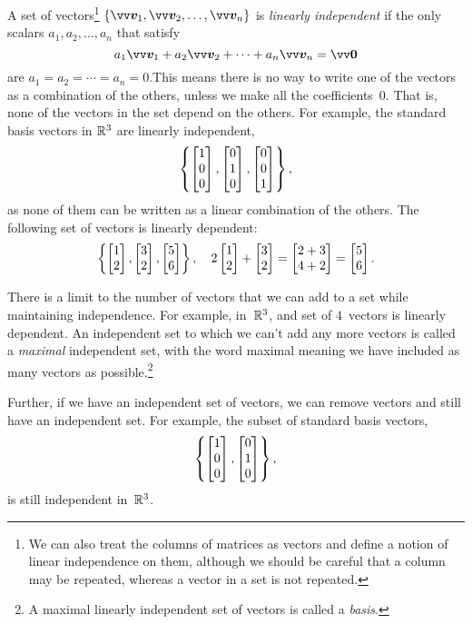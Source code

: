 \documentclass[twoside]{article}
\begin{document}
A set of vectors\footnote{
  We can also treat the columns of matrices as vectors and define a notion of linear independence on them, although we should be careful that a column may be repeated, whereas a vector in a set is not repeated.
}
$\{\bv{v}_1, \bv{v}_2, \ldots, \bv{v}_n\}$ is \emph{linearly independent} if the only scalars ${a_1, a_2, \ldots, a_n}$ that satisfy
\begin{equation*}
  a_1\bv{v}_1 + a_2\bv{v}_2 + \cdots + a_n\bv{v}_n = \bv{0}
\end{equation*}
are ${a_1 = a_2 = \cdots = a_n = 0}$.This means there is no way to write one of the vectors as a combination of the others, unless we make all the coefficients~$0$.
That is, none of the vectors in the set depend on the others.
For example, the standard basis vectors in $\mathbb{R}^3$ are linearly independent,
\begin{equation*}
  \left\{\begin{bmatrix}1\\0\\0\end{bmatrix}, \begin{bmatrix}0\\1\\0\end{bmatrix}, \begin{bmatrix}0\\0\\1\end{bmatrix}\right\},
\end{equation*}
as none of them can be written as a linear combination of the others.
The following set of vectors is linearly dependent:
\begin{equation*}
  \left\{\begin{bmatrix}1\\2\end{bmatrix}, \begin{bmatrix}3\\2\end{bmatrix}, \begin{bmatrix}5\\6\end{bmatrix}\right\}, \quad 2\begin{bmatrix}1\\2\end{bmatrix} + \begin{bmatrix}3\\2\end{bmatrix} = \begin{bmatrix}2 + 3\\4 + 2\end{bmatrix} = \begin{bmatrix}5\\6\end{bmatrix}.
\end{equation*}

There is a limit to the number of vectors that we can add to a set while maintaining independence.
For example, in~$\mathbb{R}^3$, and set of $4$~vectors is linearly dependent.
An independent set to which we can't add any more vectors is called a \emph{maximal} independent set, with the word maximal meaning we have included as many vectors as possible.\footnote{
  A maximal linearly independent set of vectors is called a \emph{basis}.
}

Further, if we have an independent set of vectors, we can remove vectors and still have an independent set.
For example, the subset of standard basis vectors,
\begin{equation*}
  \left\{\begin{bmatrix}1\\0\\0\end{bmatrix}, \begin{bmatrix}0\\1\\0\end{bmatrix}\right\},
\end{equation*}
is still independent in~$\mathbb{R}^3$.
\end{document}
